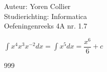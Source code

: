\documentclass[a4paper]{article}
\newcommand{\intgrl}{\displaystyle\int} %
\begin{document}
\noindent \large Auteur: Yoren Collier \\
\noindent \large Studierichting: Informatica\\
\noindent \large Oefeningenreeks 4A nr. 1.7\\

\medskip

\normalsize

$ \intgrl x^4 x^3 x^{-2} dx = \intgrl x^5 dx = \dfrac{x^6}{6} +c$\\

\begin{thebibliography}{999}
\end{thebibliography}
\end{document}
